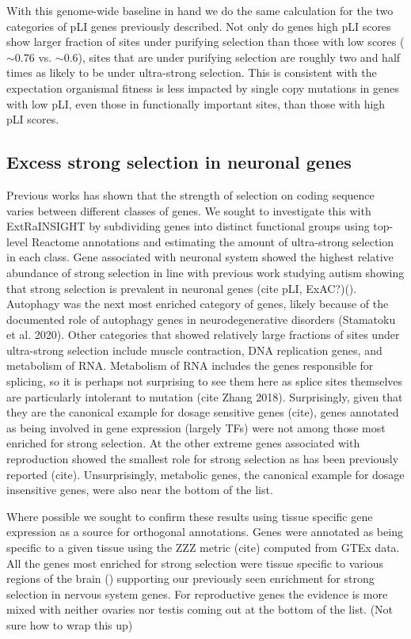 \documentclass[11pt]{article}
\begin{document}
With this genome-wide baseline in hand we do the same calculation for the two categories of pLI genes previously described. Not only do genes high pLI scores show larger fraction of sites under purifying selection than those with low scores ($\sim 0.76$ vs. $\sim 0.6$), sites that are under purifying selection are roughly two and half times as likely to be under ultra-strong selection. This is consistent with the expectation organismal fitness is less impacted by single copy mutations in genes with low pLI, even those in functionally important sites, than those with high pLI scores.

\subsection*{Excess strong selection in neuronal genes}

Previous works has shown that the strength of selection on coding sequence varies between different classes of genes. We sought to investigate this with ExtRaINSIGHT by subdividing genes into distinct functional groups using top-level Reactome annotations and estimating the amount of ultra-strong selection in each class. Gene associated with neuronal system showed the highest relative abundance of strong selection in line with previous work studying autism showing that strong selection is prevalent in neuronal genes (cite pLI, ExAC?)(). Autophagy was the next most enriched category of genes, likely because of the documented role of autophagy genes in neurodegenerative disorders (Stamatoku et al. 2020). Other categories that showed relatively large fractions of sites under ultra-strong selection include muscle contraction, DNA replication genes, and metabolism of RNA. Metabolism of RNA includes the genes responsible for splicing, so it is perhaps not surprising to see them here as splice sites themselves are particularly intolerant to mutation (cite Zhang 2018). Surprisingly, given that they are the canonical example for dosage sensitive genes (cite), genes annotated as being involved in gene expression (largely TFs) were not among those most enriched for strong selection. At the other extreme genes associated with reproduction showed the smallest role for strong selection as has been previously reported (cite). Unsurprisingly, metabolic genes, the canonical example for dosage insensitive genes, were also near the bottom of the list.

Where possible we sought to confirm these results using tissue specific gene expression as a source for orthogonal annotations. Genes were annotated as being specific to a given tissue using the ZZZ metric (cite) computed from GTEx data. All the genes most enriched for strong selection were tissue specific to various regions of the brain () supporting our previously seen enrichment for strong selection in nervous system genes. For reproductive genes the evidence is more mixed with neither ovaries nor testis coming out at the bottom of the list. (Not sure how to wrap this up)
\end{document}
